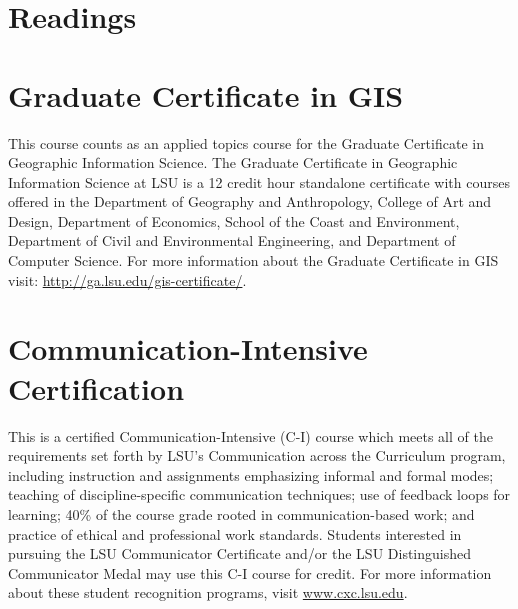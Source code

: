 \documentclass[11pt,article,oneside]{memoir}
\begin{document}
%
%

\section{Readings}
\vspace*{0.5cm}
\nocite{*}
\setlength{}
\printbibliography[heading=none]

\section{Graduate Certificate in GIS}
This course counts as an applied topics course for the 
Graduate Certificate in Geographic Information Science.
The Graduate Certificate in Geographic Information Science at LSU 
is a 12 credit hour standalone certificate
with courses offered 
in the Department of Geography and Anthropology, 
College of Art and Design, 
Department of Economics, 
School of the Coast and Environment, 
Department of Civil and Environmental Engineering, 
and Department of Computer Science. 
For more information about the Graduate Certificate in GIS visit: 
\url{http://ga.lsu.edu/gis-certificate/}.


\section{Communication-Intensive Certification}
This is a certified Communication-Intensive (C-I) course which meets all of the requirements set forth by LSU's Communication across the Curriculum program, including
instruction and assignments emphasizing informal and formal modes;
teaching of discipline-specific communication techniques;
use of feedback loops for learning;
40\% of the course grade rooted in communication-based work; 
and practice of ethical and professional work standards.
Students interested in pursuing the LSU Communicator Certificate and/or the LSU Distinguished Communicator Medal may use this C-I course for credit. For more information about these student recognition programs, visit \url{www.cxc.lsu.edu}.\\
\end{document}
